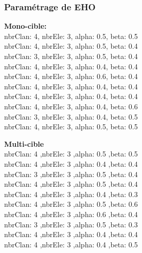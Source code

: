 \subsubsection{Paramétrage de EHO}
\noindent
\begin{minipage}[t]{0.55\textwidth}
	\textbf{Mono-cible:} \\
	nbrClan: 4, nbrEle: 3, alpha: 0.5, beta: 0.5\\
	nbrClan: 4, nbrEle: 3, alpha: 0.5, beta: 0.4\\
	nbrClan: 3, nbrEle: 3, alpha: 0.5, beta: 0.4\\
	nbrClan: 4, nbrEle: 3, alpha: 0.4, beta: 0.4\\
	nbrClan: 4, nbrEle: 3, alpha: 0.6, beta: 0.4\\
	nbrClan: 4, nbrEle: 3, alpha: 0.4, beta: 0.4\\
	nbrClan: 4, nbrEle: 3, alpha: 0.4, beta: 0.4\\
	nbrClan: 4, nbrEle: 3, alpha: 0.4, beta: 0.6\\
	nbrClan: 3, nbrEle: 3, alpha: 0.4, beta: 0.5\\
	nbrClan: 4, nbrEle: 3, alpha: 0.5, beta: 0.5\\
	
\end{minipage}\hfill
\hspace{0.2cm}
\begin{minipage}[t]{0.55\textwidth}
	\textbf{Multi-cible}\\
	nbrClan: 4 ,nbrEle: 3 ,alpha: 0.5 ,beta: 0.5\\
	nbrClan: 4 ,nbrEle: 3 ,alpha: 0.4 ,beta: 0.4\\
	nbrClan: 3 ,nbrEle: 3 ,alpha: 0.5 ,beta: 0.4\\
	nbrClan: 4 ,nbrEle: 3 ,alpha: 0.5 ,beta: 0.4\\
	nbrClan: 4 ,nbrEle: 3 ,alpha: 0.4 ,beta: 0.3\\
	nbrClan: 4 ,nbrEle: 3 ,alpha: 0.5 ,beta: 0.6\\
	nbrClan: 4 ,nbrEle: 3 ,alpha: 0.6 ,beta: 0.4\\
	nbrClan: 3 ,nbrEle: 3 ,alpha: 0.5 ,beta: 0.3\\
	nbrClan: 4 ,nbrEle: 3 ,alpha: 0.4 ,beta: 0.4\\
	nbrClan: 4 ,nbrEle: 3 ,alpha: 0.4 ,beta: 0.5\\
\end{minipage}\hfill


